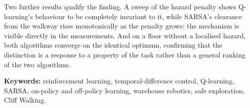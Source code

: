 Two further results qualify the finding. A sweep of the hazard penalty shows Q-learning's
behaviour to be completely invariant to it, while SARSA's clearance from the walkway rises
monotonically as the penalty grows: the mechanism is visible directly in the measurements. And on
a floor without a localised hazard, both algorithms converge on the identical optimum, confirming
that the distinction is a response to a property of the task rather than a general ranking of the
two algorithms.

\vspace{8pt}
\noindent\textbf{Keywords:} reinforcement learning, temporal-difference control, Q-learning, SARSA,
on-policy and off-policy learning, warehouse robotics, safe exploration, Cliff Walking.
